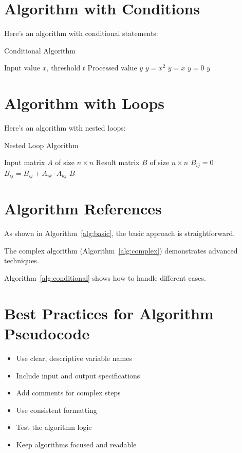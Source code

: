 \documentclass{article}
\begin{document}
\section{Algorithm with Conditions}
Here's an algorithm with conditional statements:

\begin{algorithm}
\caption{Conditional Algorithm}
\label{alg:conditional}
\begin{algorithmic}[1]
\Require Input value $x$, threshold $t$
\Ensure Processed value $y$
    \State $y = x^2$
    \State {}
    \State $y = x$
    \State {}
\Else
    \State $y = 0$
    \State {}
\EndIf
\Return $y$
\end{algorithmic}
\end{algorithm}

\section{Algorithm with Loops}
Here's an algorithm with nested loops:

\begin{algorithm}
\caption{Nested Loop Algorithm}
\label{alg:nested}
\begin{algorithmic}[1]
\Require Input matrix $A$ of size $n \times n$
\Ensure Result matrix $B$ of size $n \times n$
        \State $B_{ij} = 0$
            \State $B_{ij} = B_{ij} + A_{ik} \cdot A_{kj}$
        \EndFor
    \EndFor
\EndFor
\Return $B$
\end{algorithmic}
\end{algorithm}

\section{Algorithm References}
As shown in Algorithm~\ref{alg:basic}, the basic approach is straightforward.

The complex algorithm (Algorithm~\ref{alg:complex}) demonstrates advanced techniques.

Algorithm~\ref{alg:conditional} shows how to handle different cases.

\section{Best Practices for Algorithm Pseudocode}
\begin{itemize}
    \item Use clear, descriptive variable names
    \item Include input and output specifications
    \item Add comments for complex steps
    \item Use consistent formatting
    \item Test the algorithm logic
    \item Keep algorithms focused and readable
\end{itemize}
\end{document}
